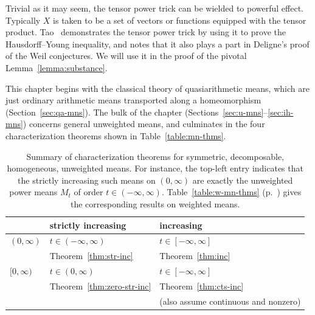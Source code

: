 Trivial as it may seem, the tensor power trick can be wielded to powerful
effect.  Typically $X$ is taken to be a set of vectors or functions
equipped with the tensor product.  Tao~\cite{TaoSR}%
%
%  
demonstrates the 
tensor power trick by using it to prove the Hausdorff--Young%
%
%
inequality, and notes that it also plays a part in Deligne's proof of the
Weil%
%
% 
conjectures.  We will use it
in the proof of the pivotal Lemma~\ref{lemma:substance}.

This chapter begins with the classical theory of quasiarithmetic means,
which are just ordinary arithmetic means transported along a homeomorphism
(Section~\ref{sec:qa-mns}).  The bulk of the chapter
(Sections~\ref{sec:u-mns}--\ref{sec:ih-mns}) concerns general unweighted
means, and culminates in the four characterization theorems shown in
Table~\ref{table:mn-thms}.

\begin{table}
\centering
\normalsize
\begin{tabular}{|l|l|l|}
\hline
                &
strictly increasing             &increasing     \\
\hline          
$(0, \infty)$   &
$t \in (-\infty, \infty)$       &$t \in [-\infty, \infty]$      \\
                &
Theorem~\ref{thm:str-inc}       &Theorem~\ref{thm:inc}          \\
\hline
$[0, \infty)$   &
$t \in (0, \infty)$             &$t \in [-\infty, \infty]$      \\
                &
Theorem~\ref{thm:zero-str-inc}  &Theorem~\ref{thm:cts-inc}      \\
                &
                                &
\small(also assume continuous and nonzero)      \\
\hline
\end{tabular}
\caption{Summary of characterization theorems for symmetric, decomposable,
  homogeneous, unweighted means.  For instance, the top-left entry
  indicates that the strictly increasing such means on $(0, \infty)$ are
  exactly the unweighted power means $M_t$ of order $t \in (-\infty,
  \infty)$.  Table~\ref{table:w-mn-thms} (p.~\pageref{table:w-mn-thms})
  gives the corresponding results on weighted means.}%
%
%
\index{power mean!characterization of!unweighted on $[0, \infty)$}%
\end{table}

